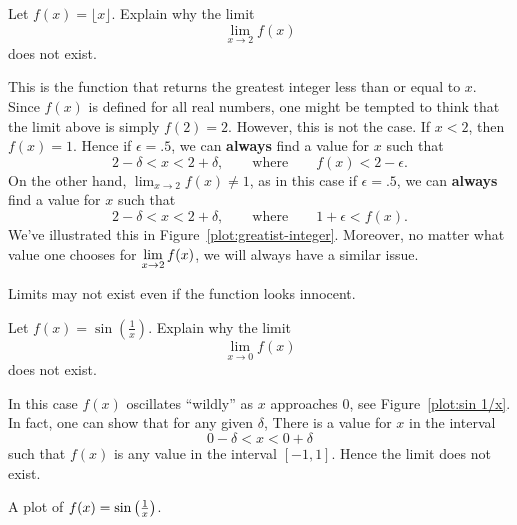 \begin{example}
Let $f(x) = \lfloor x\rfloor$. Explain why the limit
\[
\lim_{x\to 2} f(x)
\]
does not exist.

\begin{solution}
This is the function that returns the greatest integer less than or
equal to $x$. Since $f(x)$ is defined for all real numbers, one might
be tempted to think that the limit above is simply $f(2) =
2$. However, this is not the case.  If $x<2$, then $f(x) =1$. Hence if
$\epsilon = .5$, we can \textbf{always} find a value for $x$ such that
\[
2- \delta < x < 2+ \delta, \qquad\text{where} \qquad f(x)< 2-\epsilon.
\]
On the other hand, $\lim_{x\to 2} f(x)\ne 1$, as in this case if $\epsilon=.5$, we can \textbf{always} find a value for $x$ such that
\[
2- \delta < x < 2+ \delta, \qquad\text{where} \qquad  1+\epsilon<f(x).
\]
We've illustrated this in
Figure~\ref{plot:greatist-integer}. Moreover, no matter what value one
chooses for $\displaystyle \lim_{x\to 2} f(x)$, we will always have a similar
issue.
\end{solution}
\end{example}


Limits may not exist even if the function looks innocent. 

\begin{example}
Let  $f(x) = \sin\left(\frac{1}{x}\right)$. Explain why the limit
\[
\lim_{x\to 0} f(x)
\]
does not exist.

\begin{solution}
In this case $f(x)$ oscillates ``wildly'' as $x$ approaches $0$, see
Figure~\ref{plot:sin 1/x}. In fact, one can show that for any given
  $\delta$, There is a value for $x$ in the interval
\[
0-\delta < x < 0+\delta
\]
such that $f(x)$ is any value in the interval $[-1,1]$. Hence the
limit does not exist.
\end{solution}
\end{example}
\begin{marginfigure}[-1in]
\caption{A plot of $f(x)=\protect\sin\left(\frac{1}{x}\right)$.}
\label{plot:sin 1/x}
\end{marginfigure}

